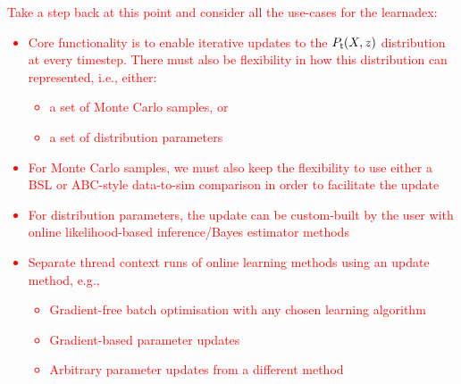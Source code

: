 \textcolor{red}{Take a step back at this point and consider all the use-cases for the learnadex:
\begin{itemize}
\item{Core functionality is to enable iterative updates to the $P_{\sf t}(X,z)$ distribution at every timestep. There must also be flexibility in how this distribution can represented, i.e., either:
\begin{itemize}
\item{a set of Monte Carlo samples, or}
\item{a set of distribution parameters}
\end{itemize}
}
\item{For Monte Carlo samples, we must also keep the flexibility to use either a BSL or ABC-style data-to-sim comparison in order to facilitate the update}
\item{For distribution parameters, the update can be custom-built by the user with online likelihood-based inference/Bayes estimator methods}
\item{Separate thread context runs of online learning methods using an update method, e.g.,}
\begin{itemize}
\item{Gradient-free batch optimisation with any chosen learning algorithm}
\item{Gradient-based parameter updates}
\item{Arbitrary parameter updates from a different method}
\end{itemize}
\end{itemize}}




